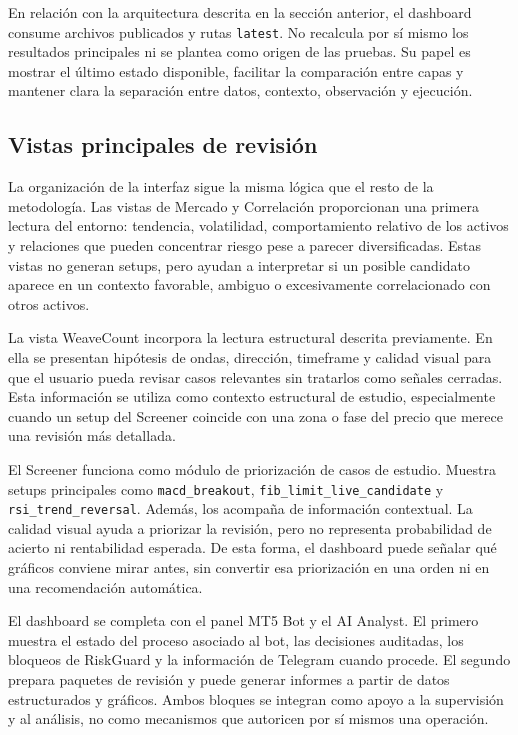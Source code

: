 En relaci\'on con la arquitectura descrita en la secci\'on anterior, el
dashboard consume archivos publicados y rutas \texttt{latest}. No recalcula por
s\'i mismo los resultados principales ni se plantea como origen de las pruebas.
Su papel es mostrar el \'ultimo estado disponible, facilitar la comparaci\'on
entre capas y mantener clara la separaci\'on entre datos, contexto, observaci\'on
y ejecuci\'on.

\subsection{Vistas principales de revisi\'on}
\label{subsec:dashboard-vistas-principales}

La organizaci\'on de la interfaz sigue la misma l\'ogica que el resto de la
metodolog\'ia. Las vistas de Mercado y Correlaci\'on proporcionan una primera
lectura del entorno: tendencia, volatilidad, comportamiento relativo de los
activos y relaciones que pueden concentrar riesgo pese a parecer diversificadas.
Estas vistas no generan setups, pero ayudan a interpretar si un posible
candidato aparece en un contexto favorable, ambiguo o excesivamente
correlacionado con otros activos.

La vista WeaveCount incorpora la lectura estructural descrita previamente. En
ella se presentan hip\'otesis de ondas, direcci\'on, timeframe y calidad
visual para que el usuario pueda revisar casos relevantes sin tratarlos como
se\~nales cerradas. Esta informaci\'on se utiliza como contexto estructural de
estudio, especialmente cuando un setup del Screener coincide con una zona o
fase del precio que merece una revisi\'on m\'as detallada.

El Screener funciona como m\'odulo de priorizaci\'on de casos de estudio. Muestra setups principales
como \texttt{macd\_breakout}, \texttt{fib\_limit\_live\_candidate} y
\texttt{rsi\_trend\_reversal}. Adem\'as, los acompa\~na de informaci\'on contextual. La
calidad visual ayuda a priorizar la revisi\'on, pero no representa probabilidad
de acierto ni rentabilidad esperada. De esta forma, el dashboard puede se\~nalar
qu\'e gr\'aficos conviene mirar antes, sin convertir esa priorizaci\'on en una
orden ni en una recomendaci\'on autom\'atica.

El dashboard se completa con el panel MT5 Bot y el AI Analyst. El primero
muestra el estado del proceso asociado al bot, las decisiones auditadas, los
bloqueos de RiskGuard y la informaci\'on de Telegram cuando procede. El segundo
prepara paquetes de revisi\'on y puede generar informes a partir de datos
estructurados y gr\'aficos. Ambos bloques se integran como apoyo a la supervisi\'on
y al an\'alisis, no como mecanismos que autoricen por s\'i mismos una operaci\'on.

